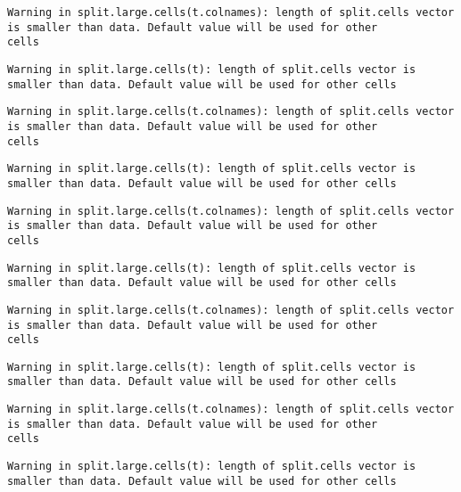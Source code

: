 \documentclass[
  10pt,
  a4paper,oneside]{article}
\begin{document}
\begin{verbatim}
Warning in split.large.cells(t.colnames): length of split.cells vector is smaller than data. Default value will be used for other
cells
\end{verbatim}

\begin{verbatim}
Warning in split.large.cells(t): length of split.cells vector is smaller than data. Default value will be used for other cells
\end{verbatim}

\begin{verbatim}
Warning in split.large.cells(t.colnames): length of split.cells vector is smaller than data. Default value will be used for other
cells
\end{verbatim}

\begin{verbatim}
Warning in split.large.cells(t): length of split.cells vector is smaller than data. Default value will be used for other cells
\end{verbatim}

\begin{verbatim}
Warning in split.large.cells(t.colnames): length of split.cells vector is smaller than data. Default value will be used for other
cells
\end{verbatim}

\begin{verbatim}
Warning in split.large.cells(t): length of split.cells vector is smaller than data. Default value will be used for other cells
\end{verbatim}

\begin{verbatim}
Warning in split.large.cells(t.colnames): length of split.cells vector is smaller than data. Default value will be used for other
cells
\end{verbatim}

\begin{verbatim}
Warning in split.large.cells(t): length of split.cells vector is smaller than data. Default value will be used for other cells
\end{verbatim}

\begin{verbatim}
Warning in split.large.cells(t.colnames): length of split.cells vector is smaller than data. Default value will be used for other
cells
\end{verbatim}

\begin{verbatim}
Warning in split.large.cells(t): length of split.cells vector is smaller than data. Default value will be used for other cells
\end{verbatim}
\end{document}
